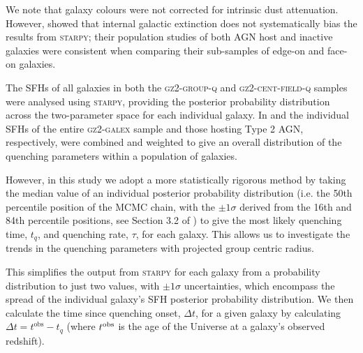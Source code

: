 \documentclass[useAMS,usenatbib]{mn2e}
\def\minor		{\color{minorcol}}
\begin{document}
We note that galaxy colours were not corrected for intrinsic dust attenuation. However,  \citet[][see Section~2.2]{smethurst16} showed that internal galactic extinction does not systematically bias the results from \textsc{starpy}; {\minor their population studies of both AGN host and inactive galaxies were consistent when comparing their sub-samples of edge-on and face-on galaxies}. 

The SFHs of all galaxies in both the \textsc{gz2-group-q} and \textsc{gz2-cent-field-q} samples were analysed using \textsc{starpy}, providing the posterior probability distribution across the two-parameter space for each individual galaxy. In \cite{smethurst15} and \cite{smethurst16} the individual SFHs of the entire \textsc{gz2-galex} sample and those hosting Type 2 AGN, respectively, were combined and weighted to give an overall distribution of the quenching parameters within a population of galaxies. 

However, in this study we adopt a more statistically rigorous method by taking the median value of an individual posterior probability distribution (i.e. the 50th percentile position of the MCMC chain, with the $\pm1\sigma$ derived from the 16th and 84th percentile positions, see Section 3.2 of \citealt{smethurst15}) to give the most likely quenching time, $t_{q}$, and quenching rate, $\tau$, for each galaxy. This allows us to investigate the trends in the quenching parameters with projected group centric radius. 

This simplifies the output from \textsc{starpy} for each galaxy from a probability distribution to just two values, with $\pm1\sigma$ uncertainties, which encompass the spread of the individual galaxy's SFH posterior probability distribution. We then calculate the time since quenching onset, $\Delta t$, for a given galaxy by calculating {\bf $\Delta t = t^\mathrm{obs} - t_{q}$} (where $t^{\rm{obs}}$ is the age of the Universe at a galaxy's observed redshift). 
\end{document}
